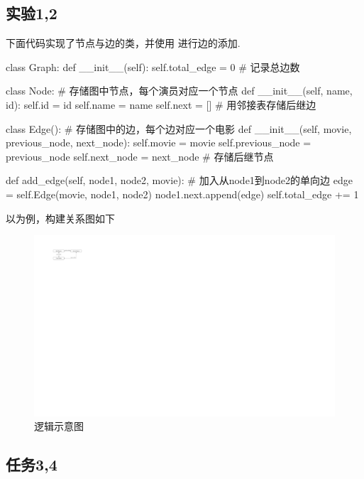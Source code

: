 \documentclass[12pt, a4paper, oneside]{ctexart}
\numberwithin{equation}{section}  %
\begin{document}
\subsection{实验1,2}
下面代码实现了节点与边的类，并使用  进行边的添加.
\begin{pythoncode}
class Graph:
    def __init__(self):
        self.total_edge = 0  # 记录总边数

    class Node:  # 存储图中节点，每个演员对应一个节点
        def __init__(self, name, id):
            self.id = id
            self.name = name
            self.next = []  # 用邻接表存储后继边

    class Edge():  # 存储图中的边，每个边对应一个电影
        def __init__(self, movie, previous_node, next_node):
            self.movie = movie
            self.previous_node = previous_node
            self.next_node = next_node  # 存储后继节点

    def add_edge(self, node1, node2, movie):  # 加入从node1到node2的单向边
        edge = self.Edge(movie, node1, node2)
        node1.next.append(edge)
        self.total_edge += 1 
\end{pythoncode}
以为例，构建关系图如下
\begin{figure}[htbp]
    \centering
    \includegraphics[scale=1]{逻辑示意图.pdf}
    \caption{逻辑示意图}
\end{figure}
\subsection{任务3,4}
\end{document}
